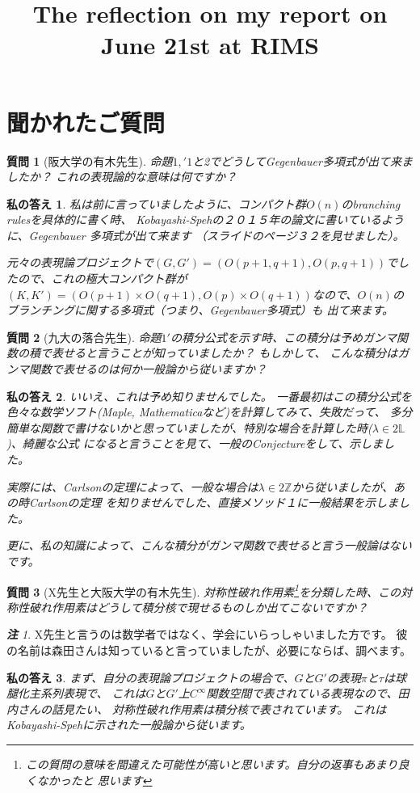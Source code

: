 \documentclass[12pt]{article} %
\title{The reflection on my report on June 21st at RIMS}
\author{}
\newtheorem{question}{質問}
\newtheorem{answer}{私の答え}
\theoremstyle{remark}
\newtheorem*{remark*}{\textbf{注}}
\begin{document}
\maketitle
\section{聞かれたご質問}
\begin{question}[阪大学の有木先生]
	命題$1,'1$と2でどうしてGegenbauer多項式が出て来ましたか？
	これの表現論的な意味は何ですか？
\end{question}
\begin{answer}
私は前に言っていましたように、コンパクト群$O(n)$のbranching rulesを具体的に書く時、
Kobayashi-Spehの２０１５年の論文に書いているように、Gegenbauer 多項式が出て来ます
{\footnotesize （スライドのページ３２を見せました）}。

元々の表現論プロジェクトで$(G,G')=(O(p+1,q+1),O(p,q+1))$でしたので、これの極大コンパクト群が
$(K,K')=(O(p+1)\times O(q+1),O(p)\times O(q+1))$なので、$O(n)$のブランチングに関する多項式（つまり、Gegenbauer多項式）も
出て来ます。
\end{answer}
\begin{question}[九大の落合先生]
	命題$1'$の積分公式を示す時、この積分は予めガンマ関数の積で表せると言うことが知っていましたか？
	もしかして、
	こんな積分はガンマ関数で表せるのは何か一般論から従いますか？
\end{question}
\begin{answer}
いいえ、これは予め知りませんでした。
一番最初はこの積分公式を色々な数学ソフト(Maple, Mathematicaなど)を計算してみて、失敗だって、
多分簡単な関数で書けないかと思っていましたが、特別な場合を計算した時($\lambda\in2\mathbb{L}$)、綺麗な公式
になると言うことを見て、一般のConjectureをして、示しました。

実際には、Carlsonの定理によって、一般な場合は$\lambda\in 2\mathbb{Z}$から従いましたが、あの時Carlsonの定理
を知りませんでした、直接メソッド１に一般結果を示しました。

更に、私の知識によって、こんな積分がガンマ関数で表せると言う一般論はないです。
\end{answer}
\begin{question}[X先生と大阪大学の有木先生]
	対称性破れ作用素\footnote{この質問の意味を間違えた可能性が高いと思います。自分の返事もあまり良くなかったと
	思います}を分類した時、この対称性破れ作用素はどうして積分核で現せるものしか出てこないですか？
\end{question}
\begin{remark*}
	X先生と言うのは数学者ではなく、学会にいらっしゃいました方です。
	彼の名前は森田さんは知っていると言っていましたが、必要にならば、調べます。
\end{remark*}
\begin{answer}
	まず、自分の表現論プロジェクトの場合で、$G$と$G'$の表現$\pi$と$\tau$は球腿化主系列表現で、
	これは$G$と$G'$上$C^\infty$関数空間で表されている表現なので、田内さんの話見たい、
	対称性破れ作用素は積分核で表されています。
	これはKobayashi-Spehに示された一般論から従います。
\end{answer}
\end{document}
